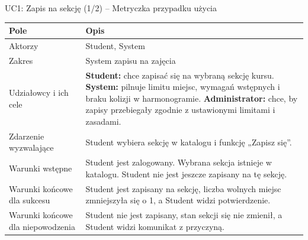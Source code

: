 \documentclass[aspectratio=169, 10pt, xcolor=table]{beamer}
\renewcommand{\arraystretch}{1.18}
\begin{document}
\begin{frame}{UC1: Zapis na sekcję (1/2) -- Metryczka przypadku użycia}
    \scriptsize
    \renewcommand{\arraystretch}{1.18}
    \begin{tabularx}{\textwidth}{|U{3.6cm}|Y|}
        \hline
        \textcolor{NavyPrimary}{\textbf{Pole}} & \textcolor{NavyPrimary}{\textbf{Opis}} \\
        \hline
        Aktorzy & Student, System \\
        \hline
        Zakres & System zapisu na zajęcia \\
        \hline
        Udziałowcy i ich cele & \textbf{Student:} chce zapisać się na wybraną sekcję kursu. \textbf{System:} pilnuje limitu miejsc, wymagań wstępnych i braku kolizji w harmonogramie. \textbf{Administrator:} chce, by zapisy przebiegały zgodnie z ustawionymi limitami i zasadami. \\
        \hline
        Zdarzenie wyzwalające & Student wybiera sekcję w katalogu i funkcję „Zapisz się”. \\
        \hline
        Warunki wstępne & Student jest zalogowany. Wybrana sekcja istnieje w katalogu. Student nie jest jeszcze zapisany na tę sekcję. \\
        \hline
        Warunki końcowe dla sukcesu & Student jest zapisany na sekcję, liczba wolnych miejsc zmniejszyła się o 1, a Student widzi potwierdzenie. \\
        \hline
        Warunki końcowe dla niepowodzenia & Student nie jest zapisany, stan sekcji się nie zmienił, a Student widzi komunikat z przyczyną. \\
        \hline
    \end{tabularx}
\end{frame}
\end{document}
